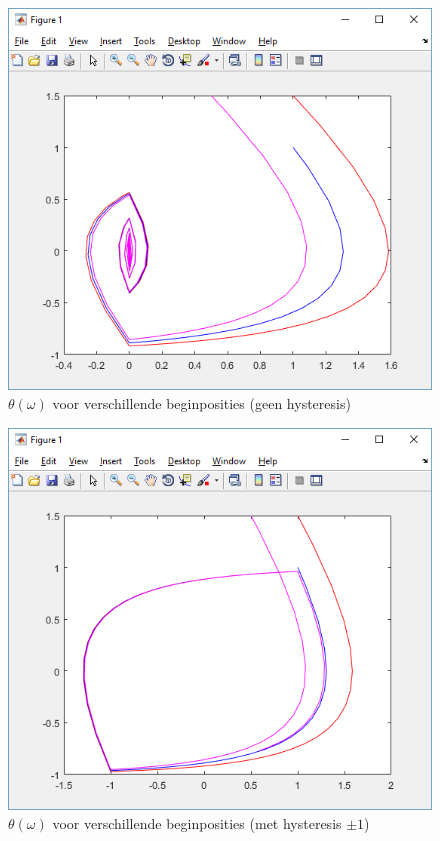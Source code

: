 \documentclass[12pt]{article}
\begin{document}
\begin{figure}
	\centering
	\includegraphics[height=0.4\textheight, keepaspectratio]{xydrienohys.png}
	\caption{$\theta(\omega)$ voor verschillende beginposities (geen hysteresis)}
	\label{xydrienohys}
\end{figure}
\begin{figure}
	\centering
	\includegraphics[height=0.4\textheight, keepaspectratio]{xydriehys.png}
	\caption{$\theta(\omega)$ voor verschillende beginposities (met hysteresis $\pm 1$)}
	\label{xydriehys}
\end{figure}
\end{document}
